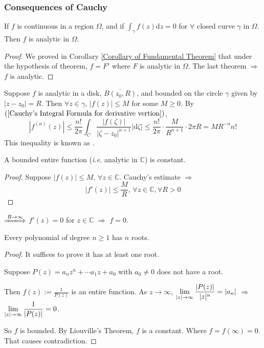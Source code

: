 \subsubsection{Consequences of Cauchy}
\begin{theorem}
    If  $ f $ is continuous in a region  $ \Omega $, and if  $ \int_\gamma f(z)\mathrm{d}z=0 $ for  $ \forall $ closed curve $ \gamma $ in  $ \Omega $. Then  $ f $ is analytic in   $ \Omega $.       
\end{theorem}
\begin{proof}
    We proved in Corollary \ref{Corollary of Fundamental Theorem} that under the hypothesis of theorem,  $ f=F' $ where  $ F $ is analytic in  $ \Omega $. The last theorem  $ \Rightarrow  $ $ f $ is analytic.
\end{proof}
Suppose  $ f $ is analytic in a disk, $ \overline{B(z_0,R)} $, and   bounded on the circle $ \gamma $ given by  $ |z-z_0|=R $. Then  $ \forall z\in \gamma $, $ |f(z)| \leq M $  for some  $ M \geq 0 $. By  $ (\ref{Cauchy's Integral Formula for derivative vertion}) $,
\begin{equation}
    |f^{(n)}(z)| \leq \frac{n!}{2\pi}\int_C\frac{|f(\zeta)|}{|\zeta-z_0|^{n+1}}|\mathrm{d}\zeta| \leq \frac{n!}{2\pi}\cdot\frac{M}{R^{n+1}}\cdot 2\pi R=MR^{-n}n!
\end{equation}    
This inequality is known as .
\begin{theorem}
    A bounded entire function (\textit{i.e.} analytic in  $ \mathbb{C} $) is constant.
\end{theorem}
\begin{proof}
    Suppose  $ |f(z)| \leq M $, $ \forall z\in \mathbb{C} $. Cauchy's estimate $ \Rightarrow   $ 
    \begin{equation}
        |f'(z)| \leq \frac{M}{R},\,\forall z\in \mathbb{C},\forall R>0
    \end{equation}  
\end{proof}
 $ \xLongrightarrow{R\to\infty}  $ $ f'(z)=0 $ for  $ z\in \mathbb{C} $   $ \Rightarrow  $ $ f=0 $.  
 \begin{theorem}
    Every polynomial of degree  $ n \geq 1 $ has  $ n $ roots.  
 \end{theorem}
\begin{proof}
    It suffices to prove it has at least one root.

    Suppose  $ P(z)=a_nz^n+\cdots a_1z+a_0 $ with  $ a_0\neq0 $ does not have a root.
    
    Then  $ f(z):=\frac{1}{P(z)} $ is an entire function. As  $ z\rightarrow \infty $,  $ \displaystyle\lim\limits_{|z|\to\infty}\frac{|P(z)|}{|z|^n}=|a_n| $ $ \Rightarrow  $ $ \displaystyle\lim\limits_{|z|\to\infty}\frac{1}{|P(z)|}=0 $.

    So  $ f $ is bounded. By Liouville's Theorem,  $ f  $ is a constant. Where  $ f=f(\infty)=0 $. That causes contradiction.   
\end{proof}
